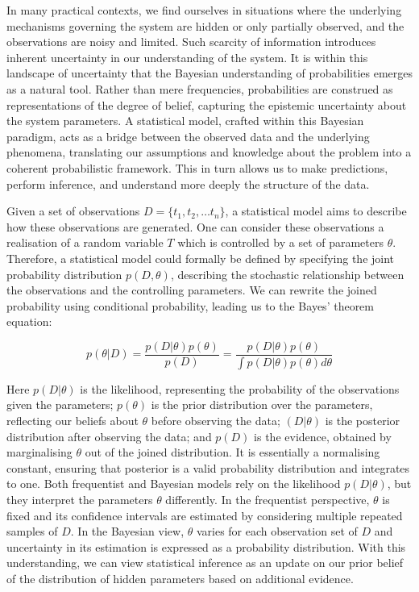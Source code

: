 In many practical contexts, we find ourselves in situations where the underlying mechanisms governing the system are hidden or only partially observed, and the observations are noisy and limited. Such scarcity of information introduces inherent uncertainty in our understanding of the system. It is within this landscape of uncertainty that the Bayesian understanding of probabilities emerges as a natural tool. Rather than mere frequencies, probabilities are construed as representations of the degree of belief, capturing the epistemic uncertainty about the system parameters. A statistical model, crafted within this Bayesian paradigm, acts as a bridge between the observed data and the underlying phenomena, translating our assumptions and knowledge about the problem into a coherent probabilistic framework. This in turn allows us to make predictions, perform inference, and understand more deeply the structure of the data.

Given a set of observations ${D} = \{t_1, t_2, … t_n\}$, a statistical model aims to describe how these observations are generated. One can consider these observations a realisation of a random variable $T$ which is controlled by a set of parameters $\theta$. Therefore, a statistical model could formally be defined by specifying the joint probability distribution $p({D}, \theta)$, describing the stochastic relationship between the observations and the controlling parameters. We can rewrite the joined probability using conditional probability, leading us to the Bayes' theorem equation:

\begin{equation}
p(\theta | {D}) = \frac{p({D} | \theta) p(\theta)}{p({D})} = \frac{p({D} | \theta) p(\theta)}{\int p({D} | \theta) p(\theta) d\theta}
\end{equation}

Here $p({D}|\theta)$ is the likelihood, representing the probability of the observations given the parameters; $p(\theta)$ is the prior distribution over the parameters, reflecting our beliefs about $\theta$ before observing the data; $({D}| \theta)$ is the posterior distribution after observing the data; and $p({D})$ is the evidence, obtained by marginalising $\theta$ out of the joined distribution. It is essentially a normalising constant, ensuring that posterior is a valid probability distribution and integrates to one. 
Both frequentist and Bayesian models rely on the likelihood $p({D}|\theta)$, but they interpret the parameters $\theta$ differently. In the frequentist perspective, $\theta$ is fixed and its confidence intervals are estimated by considering multiple repeated samples of ${D}$. In the Bayesian view, $\theta$ varies for each observation set of ${D}$ and uncertainty in its estimation is expressed as a probability distribution. With this understanding, we can view statistical inference as an update on our prior belief of the distribution of hidden parameters based on additional evidence.

